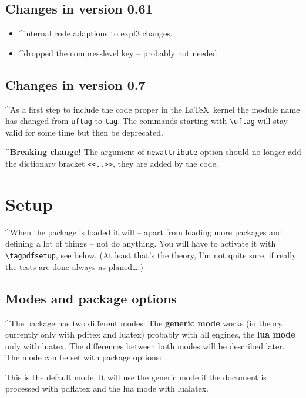 \documentclass[DIV=12,parskip=half-,bibliography=totoc]{scrartcl}
\begin{document}
\subsection{Changes in version 0.61}
\begin{itemize}
\item \TagP^internal code adaptions to expl3 changes.\Pmeti
\item \TagP^dropped the compresslevel key  -- probably not needed\Pmeti
\end{itemize}

\subsection{Changes in version 0.7}

\TagP^As a first step to include the code proper in the \LaTeX\ kernel the module name has changed from \texttt{uftag} to \texttt{tag}. The commands starting with \verb|\uftag| will stay valid for some time but then be deprecated.\TagPend

\TagP^\textbf{Breaking change!} The argument of \texttt{newattribute} option should no longer add the dictionary bracket \verb+<<..>>+, they are added by the code.\TagPend

\section{Setup}

\TagP^When the package is loaded it will -- apart from loading more packages and defining a lot of things -- not do anything. You will have to activate it with \verb+\tagpdfsetup+, see below. (At least that's the theory, I'm not quite sure, if really the tests are done always as planed\ldots.)
\TagPend


\subsection{Modes and package options}

\TagP^The package has two different modes: The \textbf{generic mode} works (in theory, currently only with pdftex and luatex) probably with all engines, the \textbf{lua mode} only with luatex. The differences between both modes  will be described later. The mode can be set with package options:


\TagP This is the default mode. It will use the generic mode if the document is processed with pdflatex and the lua mode with lualatex.
\end{document}
